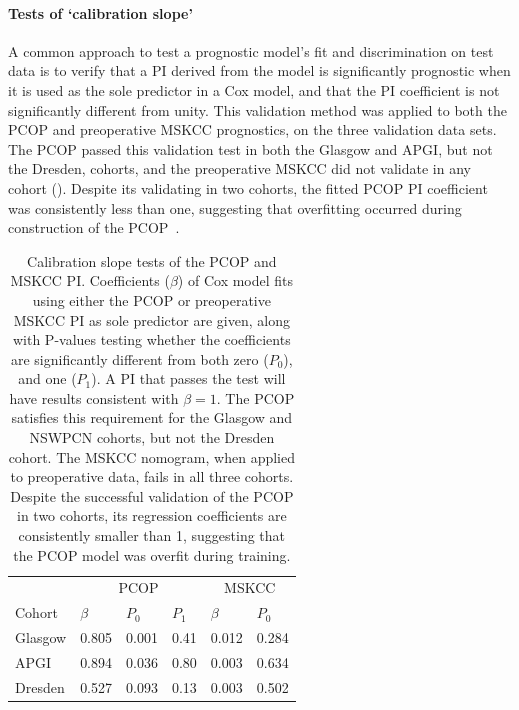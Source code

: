 \documentclass[dissertation.tex]{subfiles}
\begin{document}
\paragraph{Tests of `calibration slope'}
A common approach to test a prognostic model's fit and discrimination on test data is to verify that a \gls{PI} derived from the model is significantly prognostic when it is used as the sole predictor in a Cox model, and that the \gls{PI} coefficient is not significantly different from unity.  This validation method was applied to both the \gls{PCOP} and preoperative \gls{MSKCC} prognostics, on the three validation data sets.  The \gls{PCOP} passed this validation test in both the Glasgow and \gls{APGI}, but not the Dresden, cohorts, and the preoperative \gls{MSKCC} did not validate in any cohort ().  Despite its validating in two cohorts, the fitted \gls{PCOP} \gls{PI} coefficient was consistently less than one, suggesting that overfitting occurred during construction of the \gls{PCOP}~\cite{Royston2013}.

\begin{table}[!htbp]
\centering
\caption[Tests of \texorpdfstring{\acrshort{PCOP}}{PCOP} calibration slope]{Calibration slope tests of the \gls{PCOP} and \gls{MSKCC} \gls{PI}.  Coefficients ($\beta$) of Cox model fits using either the \gls{PCOP} or preoperative \gls{MSKCC} \gls{PI} as sole predictor are given, along with P-values testing whether the coefficients are significantly different from both zero ($P_0$), and one ($P_1$).  A \gls{PI} that passes the test will have results consistent with $\beta = 1$.  The \gls{PCOP} satisfies this requirement for the Glasgow and \gls{NSWPCN} cohorts, but not the Dresden cohort.  The \gls{MSKCC} nomogram, when applied to preoperative data, fails in all three cohorts.  Despite the successful validation of the \gls{PCOP} in two cohorts, its regression coefficients are consistently smaller than 1, suggesting that the \gls{PCOP} model was overfit during training.}\label{tab:nomo-val-slope}
\begin{tabular}{@{}llllll@{}}
\toprule
          & \multicolumn{3}{c}{PCOP}     & \multicolumn{2}{c}{MSKCC}  \\ \cmidrule(r){2-4} \cmidrule(r){5-6}
Cohort    & $\beta$  & $P_0$   & $P_1$   & $\beta$    & $P_0$         \\ \midrule
Glasgow   & 0.805    & 0.001   & 0.41    & 0.012      & 0.284         \\
APGI      & 0.894    & 0.036   & 0.80    & 0.003      & 0.634         \\
Dresden   & 0.527    & 0.093   & 0.13    & 0.003      & 0.502         \\ \bottomrule
\end{tabular}
\end{table}
\end{document}
